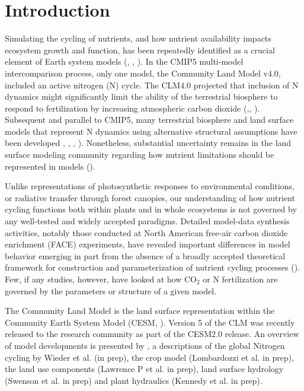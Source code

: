 \documentclass[draft,linenumbers]{agujournal}
\begin{document}
\section{Introduction}

Simulating the cycling of nutrients, and how nutrient availability impacts ecosystem growth and function, has been repeatedly identified as a crucial element of Earth system models (\cite{piao2013}, \cite{gruber2008}, \cite{wang2009}). In the CMIP5 multi-model intercomparison process, only one model, the Community Land Model v4.0, included an active nitrogen (N) cycle. The CLM4.0 projected that inclusion of N dynamics might significantly limit the ability of the terrestrial biosphere to respond to fertilization by increasing atmospheric carbon dioxide (\cite{friedlingstein2006},\cite{friedlingstein2014}, \cite{arora2013}). Subsequent and parallel to CMIP5, many terrestrial biosphere and land surface models that represent N dynamics using alternative structural assumptions have been developed \cite{wang2007}, \cite{zaehle2010}, \cite{goll2012}, \cite{smith2014}). Nonetheless, substantial uncertainty remains in the land surface modeling community regarding how nutrient limitations should be represented in models (\cite{zaehledalmonech2011}).


Unlike representations of photosynthetic responses to environmental conditions, or radiative transfer through forest canopies, our understanding of how nutrient cycling functions both within plants and in whole ecosystems is not governed by any well-tested and widely accepted paradigms. Detailed model-data synthesis activities, notably those conducted at North American free-air carbon dioxide enrichment (FACE) experiments, have revealed important differences in model behavior emerging in part from the absence of a broadly accepted theoretical framework for construction and parameterization of nutrient cycling processes (\cite{zaehle2014}). Few, if any studies, however, have looked at how CO$_{2}$ or N fertilization are governed by the parameters or structure of a given model.


The Community Land Model is the land surface representation within the Community Earth System Model (CESM, \cite{hurrell2013}). Version 5 of the CLM was recently released to the research community as part of the CESM2.0 release. An overview of model developments is presented by \cite{lawrence2018}, a descriptions of the global Nitrogen cycling by Wieder et al. (in prep), the crop model (Lombardozzi et al. in prep), the land use components (Lawrence P et al. in prep), land surface hydrology (Swenson et al. in prep) and plant hydraulics (Kennedy et al. in prep).
\end{document}
